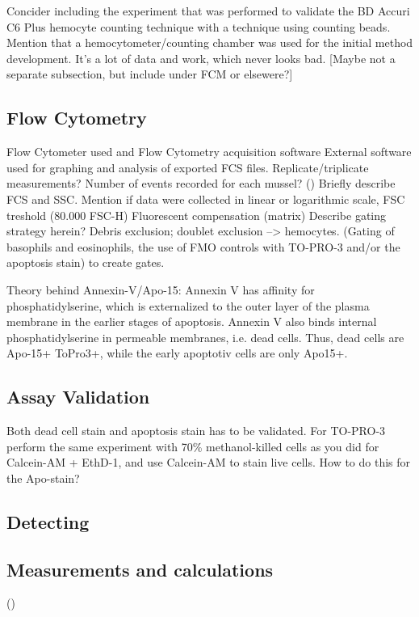 Concider including the experiment that was performed to validate the BD Accuri C6 Plus hemocyte counting technique with a technique using counting beads. Mention that a hemocytometer/counting chamber was used for the initial method development. It's a lot of data and work, which never looks bad. [Maybe not a separate subsection, but include under FCM or elsewere?]

\subsection{Flow Cytometry}
Flow Cytometer used and Flow Cytometry acquisition software
External software used for graphing and analysis of exported FCS files.
Replicate/triplicate measurements?
Number of events recorded for each mussel? ()
Briefly describe FCS and SSC.
Mention if data were collected in linear or logarithmic scale, 
FSC treshold (80.000 FSC-H)
Fluorescent compensation (matrix)
Describe gating strategy herein? Debris exclusion; doublet exclusion --> hemocytes. (Gating of basophils and eosinophils, the use of FMO controls with TO-PRO-3 and/or the apoptosis stain) to create gates.

Theory behind Annexin-V/Apo-15: Annexin V
has affinity for phosphatidylserine, which is externalized to the
outer layer of the plasma membrane in the earlier stages of
apoptosis. Annexin V also binds internal phosphatidylserine in
permeable membranes, i.e. dead cells. Thus, dead cells are Apo-15+ ToPro3+, while the early apoptotiv cells are only Apo15+.

\begin{table}[H]
	\centering
	\caption{The FCM acquisition and fluidics settings specified with the BD Accuri C6 Plus acquisition software during the flow cytometric experiments reported in this work.}
	\label{tb:FCM_settings}
\end{table}

\subsection{Assay Validation}
Both dead cell stain and apoptosis stain has to be validated. For TO-PRO-3 perform the same experiment with 70\% methanol-killed cells as you did for Calcein-AM + EthD-1, and use Calcein-AM to stain live cells.
How to do this for the Apo-stain?

\subsection{Detecting }

\subsection{Measurements and calculations}
(\cite{R-project})